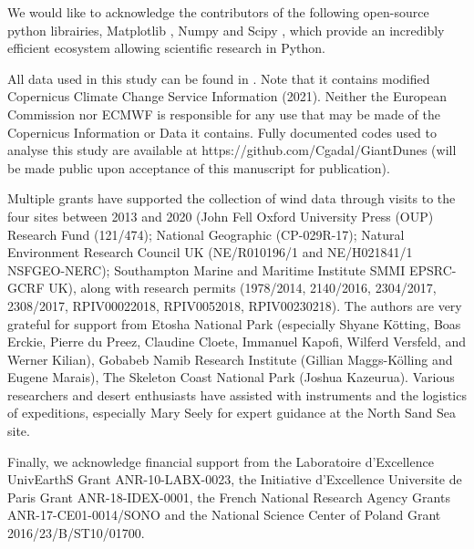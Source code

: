\begin{acknowledgements}
We would like to acknowledge the contributors of the following open-source python librairies, Matplotlib \citep{Hunter2007}, Numpy \citep{Harris2020} and Scipy \citep{Virtanen2020}, which provide an incredibly efficient ecosystem allowing scientific research in Python.

All data used in this study can be found in \citet{DataPaper}. Note that it contains modified Copernicus Climate Change Service Information (2021). Neither the European Commission nor ECMWF is responsible for any use that may be made of the Copernicus Information or Data it contains. Fully documented codes used to analyse this study are available at https://github.com/Cgadal/GiantDunes (will be made public upon acceptance of this manuscript for publication).


Multiple grants have supported the collection of wind data through visits to the four sites between 2013 and 2020 (John Fell Oxford University Press (OUP) Research Fund (121/474); National Geographic (CP-029R-17); Natural Environment Research Council UK (NE/R010196/1 and NE/H021841/1 NSFGEO-NERC); Southampton Marine and Maritime Institute SMMI EPSRC-GCRF UK), along with research permits (1978/2014, 2140/2016, 2304/2017, 2308/2017, RPIV00022018, RPIV0052018, RPIV00230218).  The authors are very grateful for support from Etosha National Park (especially Shyane Kötting, Boas Erckie, Pierre du Preez, Claudine Cloete, Immanuel Kapofi, Wilferd Versfeld, and Werner Kilian), Gobabeb Namib Research Institute (Gillian Maggs-Kölling and Eugene Marais), The Skeleton Coast National Park (Joshua Kazeurua).  Various researchers and desert enthusiasts have assisted with instruments and the logistics of expeditions, especially Mary Seely for expert guidance at the North Sand Sea site.

Finally, we acknowledge financial support from the Laboratoire d’Excellence UnivEarthS Grant ANR-10-LABX-0023, the Initiative d’Excellence Universite de Paris Grant ANR-18-IDEX-0001, the French National Research Agency Grants ANR-17-CE01-0014/SONO and the National Science Center of Poland Grant 2016/23/B/ST10/01700.

\end{acknowledgements}


